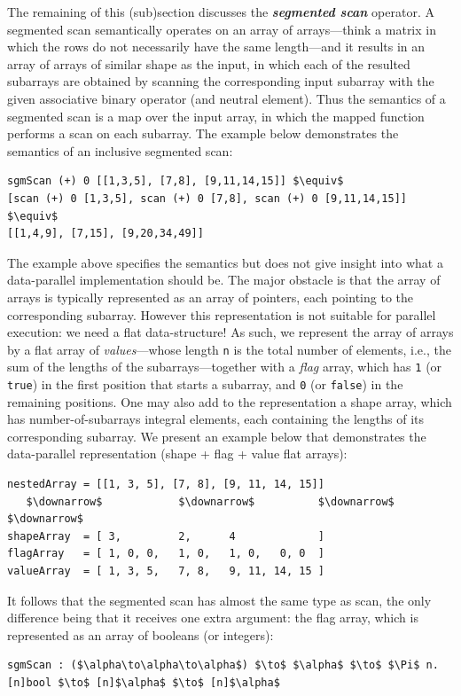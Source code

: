 \documentclass[acmsmall,review]{acmart}\settopmatter{printfolios=true,printccs=false,printacmref=false}
\begin{document}
The remaining of this (sub)section discusses the \textbf{\em segmented scan} 
operator. A segmented scan semantically operates on an array of arrays---think 
a matrix in which the rows do not necessarily have the same length---and it
results in an array of arrays of similar shape as the input, in which each
of the resulted subarrays are obtained by scanning the corresponding input
subarray with the given associative binary operator (and neutral element).
Thus the semantics of a segmented scan is a map over the input array, in 
which the mapped function performs a scan on each subarray. The example
below demonstrates the semantics of an inclusive segmented scan:
\begin{lstlisting}[mathescape=true]
sgmScan (+) 0 [[1,3,5], [7,8], [9,11,14,15]] $\equiv$
[scan (+) 0 [1,3,5], scan (+) 0 [7,8], scan (+) 0 [9,11,14,15]] $\equiv$
[[1,4,9], [7,15], [9,20,34,49]]
\end{lstlisting}\vspace{-2ex}

The example above specifies the semantics but does not give insight into
what a data-parallel implementation should be. The major obstacle is that
the array of arrays is typically represented as an array of pointers,
each pointing to the corresponding subarray.
However this representation is not suitable for parallel execution: we 
need a flat data-structure! As such, we represent the array of arrays 
by a flat array of \emph{values}---whose length {\tt n} is the total
number of elements, i.e., the sum of the lengths of the subarrays---together 
with a \emph{flag} array, which has {\tt 1} (or \lstinline{true}) in the 
first position that starts a subarray, and {\tt 0} (or \lstinline{false}) 
in the remaining positions. One may also add to the representation a
shape array, which has number-of-subarrays integral elements, each
containing the lengths of its corresponding subarray. We present an 
example below that demonstrates the data-parallel representation 
(shape + flag + value flat arrays):
\begin{lstlisting}[mathescape=true]
nestedArray = [[1, 3, 5], [7, 8], [9, 11, 14, 15]]
   $\downarrow$            $\downarrow$          $\downarrow$        $\downarrow$
shapeArray  = [ 3,         2,      4             ]
flagArray   = [ 1, 0, 0,   1, 0,   1, 0,   0, 0  ]
valueArray  = [ 1, 3, 5,   7, 8,   9, 11, 14, 15 ]
\end{lstlisting}\vspace{-2ex}

It follows that the segmented scan has almost the same type as scan,
the only difference being that it receives one extra argument: the flag
array, which is represented as an array of booleans (or integers):
\begin{lstlisting}[mathescape=true]
sgmScan : ($\alpha\to\alpha\to\alpha$) $\to$ $\alpha$ $\to$ $\Pi$ n. [n]bool $\to$ [n]$\alpha$ $\to$ [n]$\alpha$
\end{lstlisting}\vspace{-2ex}
\end{document}
